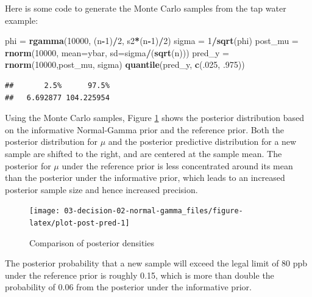 \documentclass[]{book}
\newenvironment{Shaded}{\begin{snugshade}}{\end{snugshade}}
\newcommand{\KeywordTok}[1]{\textcolor[rgb]{0.13,0.29,0.53}{\textbf{#1}}}
\newcommand{\DataTypeTok}[1]{\textcolor[rgb]{0.13,0.29,0.53}{#1}}
\newcommand{\DecValTok}[1]{\textcolor[rgb]{0.00,0.00,0.81}{#1}}
\newcommand{\StringTok}[1]{\textcolor[rgb]{0.31,0.60,0.02}{#1}}
\newcommand{\OperatorTok}[1]{\textcolor[rgb]{0.81,0.36,0.00}{\textbf{#1}}}
\newcommand{\NormalTok}[1]{#1}
\theoremstyle{definition}
\theoremstyle{definition}
\theoremstyle{definition}
\theoremstyle{remark}
\begin{document}
Here is some code to generate the Monte Carlo samples from the tap water
example:

\begin{Shaded}
\begin{Highlighting}[]
\NormalTok{phi =}\StringTok{ }\KeywordTok{rgamma}\NormalTok{(}\DecValTok{10000}\NormalTok{, (n}\OperatorTok{-}\DecValTok{1}\NormalTok{)}\OperatorTok{/}\DecValTok{2}\NormalTok{, s2}\OperatorTok{*}\NormalTok{(n}\OperatorTok{-}\DecValTok{1}\NormalTok{)}\OperatorTok{/}\DecValTok{2}\NormalTok{)}
\NormalTok{sigma =}\StringTok{ }\DecValTok{1}\OperatorTok{/}\KeywordTok{sqrt}\NormalTok{(phi)}
\NormalTok{post_mu =}\StringTok{ }\KeywordTok{rnorm}\NormalTok{(}\DecValTok{10000}\NormalTok{, }\DataTypeTok{mean=}\NormalTok{ybar, }\DataTypeTok{sd=}\NormalTok{sigma}\OperatorTok{/}\NormalTok{(}\KeywordTok{sqrt}\NormalTok{(n)))}
\NormalTok{pred_y =}\StringTok{  }\KeywordTok{rnorm}\NormalTok{(}\DecValTok{10000}\NormalTok{,post_mu, sigma)}
\KeywordTok{quantile}\NormalTok{(pred_y, }\KeywordTok{c}\NormalTok{(.}\DecValTok{025}\NormalTok{, .}\DecValTok{975}\NormalTok{))}
\end{Highlighting}
\end{Shaded}

\begin{verbatim}
##       2.5%      97.5% 
##   6.692877 104.225954
\end{verbatim}

Using the Monte Carlo samples, Figure \ref{fig:plot-post-pred} shows the
posterior distribution based on the informative Normal-Gamma prior and
the reference prior. Both the posterior distribution for \(\mu\) and the
posterior predictive distribution for a new sample are shifted to the
right, and are centered at the sample mean. The posterior for \(\mu\)
under the reference prior is less concentrated around its mean than the
posterior under the informative prior, which leads to an increased
posterior sample size and hence increased precision.

\begin{figure}

{\centering \texttt{[image: 03-decision-02-normal-gamma\_files/figure-latex/plot-post-pred-1]} 

}

\caption{Comparison of posterior densities}\label{fig:plot-post-pred}
\end{figure}

The posterior probability that a new sample will exceed the legal limit
of 80 ppb under the reference prior is roughly 0.15, which is more than
double the probability of 0.06 from the posterior under the informative
prior.
\end{document}

